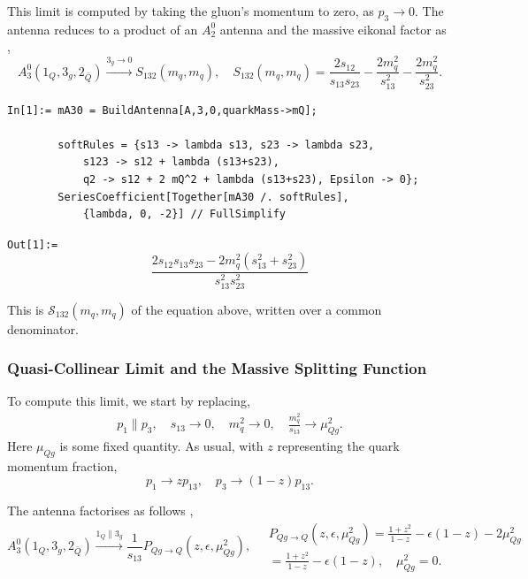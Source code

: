 This limit is computed by taking the gluon's momentum to zero, as $p_3\to0$. The antenna reduces to a product of 
an $A_2^0$ antenna and the massive eikonal factor as \cite{GehrmannDeRidder:2009fz},
\begin{equation}
    A_3^0(1_Q,3_g,2_{\bar Q})\xrightarrow{3_g\to0}S_{132}(m_q,m_q),\quad S_{132}(m_q,m_q) = \frac{2s_{12}}{s_{13}s_{23}}-\frac{2m_q^2}{s_{13}^2}-\frac{2m_q^2}{s_{23}^2}.
\end{equation}

\begin{mdframed}[backgroundcolor=gray!10, linewidth=0pt]
\begin{lstlisting}
In[1]:= mA30 = BuildAntenna[A,3,0,quarkMass->mQ];

        softRules = {s13 -> lambda s13, s23 -> lambda s23,
            s123 -> s12 + lambda (s13+s23),
            q2 -> s12 + 2 mQ^2 + lambda (s13+s23), Epsilon -> 0};
        SeriesCoefficient[Together[mA30 /. softRules],
            {lambda, 0, -2}] // FullSimplify
\end{lstlisting}
\texttt{Out[1]:=}
    \begin{equation*}
        \frac{2s_{12}s_{13}s_{23}-2m_q^2\left(s_{13}^2+s_{23}^2\right)}{s_{13}^2s_{23}^2}
    \end{equation*}
\end{mdframed}
This is $\mathcal S_{132}(m_q,m_q)$ of the equation above, written over a common denominator.


\subsubsection{Quasi-Collinear Limit and the Massive Splitting Function}

To compute this limit, we start by replacing,
\begin{equation}
    \begin{gathered}
        p_1\parallel p_3,\quad s_{13}\to 0,\quad m_q^2\to 0,\quad \frac{m_q^2}{s_{13}}\to \mu_{Qg}^2.
    \end{gathered}
\end{equation}
Here $\mu_{Qg}$ is some fixed quantity.
As usual, with $z$ representing the quark momentum fraction,
\begin{equation}
    p_1\to zp_{13},\quad p_3\to(1-z)p_{13}.
\end{equation}


The antenna factorises as follows \cite{GehrmannDeRidder:2009fz},
\begin{equation}
    A_3^0(1_Q,3_g,2_{\bar Q})\xrightarrow{1_Q\parallel 3_g}\frac1{s_{13}}P_{Qg\to Q}(z,\epsilon,\mu_{Qg}^2),\quad
    \begin{gathered}
        P_{Qg\to Q}(z,\epsilon,\mu_{Qg}^2) = \frac{1+z^2}{1-z}-\epsilon(1-z)-2\mu_{Qg}^2\\
        = \frac{1+z^2}{1-z}-\epsilon(1-z),\quad\mu_{Qg}^2=0.
    \end{gathered}
\end{equation}

